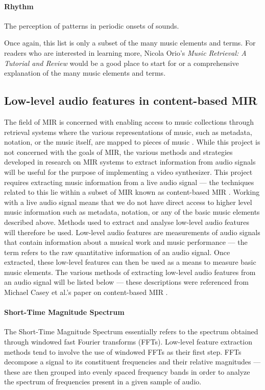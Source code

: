 \documentclass[../initial_thesis.tex]{subfiles}
\begin{document}
\paragraph{Rhythm} The perception of patterns in periodic onsets of sounds. \\
\par

Once again, this list is only a subset of the many music elements and terms. For readers who are interested in learning more, Nicola Orio's \textit{Music Retrieval: A Tutorial and Review} \cite{Orio2006} would be a good place to start for or a comprehensive explanation of the many music elements and terms.

\subsection{Low-level audio features in content-based MIR}\label{sec:lowlevelaudio}
The field of MIR is concerned with enabling access to music collections through retrieval systems where the various representations of music, such as metadata, notation, or the music itself, are mapped to pieces of music \cite{Downie}. While this project is not concerned with the goals of MIR, the various methods and strategies developed in research on MIR systems to extract information from audio signals will be useful for the purpose of implementing a video synthesizer. This project requires extracting music information from a live audio signal --- the techniques related to this lie within a subset of MIR known as content-based MIR \cite{Casey2008}. Working with a live audio signal means that we do not have direct access to higher level music information such as metadata, notation, or any of the basic music elements described above. Methods used to extract and analyse low-level audio features will therefore be used. Low-level audio features are measurements of audio signals that contain information about a musical work and music performance \cite{Casey2008} --- the term refers to the raw quantitative information of an audio signal. Once extracted, these low-level features can then be used as a means to measure basic music elements. The various methods of extracting low-level audio features from an audio signal will be listed below --- these descriptions were referenced from Michael Casey et al.'s paper on content-based MIR \cite{Casey2008}.

\paragraph{Short-Time Magnitude Spectrum}
The Short-Time Magnitude Spectrum essentially refers to the spectrum obtained through windowed fast Fourier transforms (FFTs). Low-level feature extraction methods tend to involve the use of windowed FFTs as their first step. FFTs decompose a signal to its constituent frequencies and their relative magnitudes --- these are then grouped into evenly spaced frequency bands in order to analyze the spectrum of frequencies present in a given sample of audio.
\end{document}
